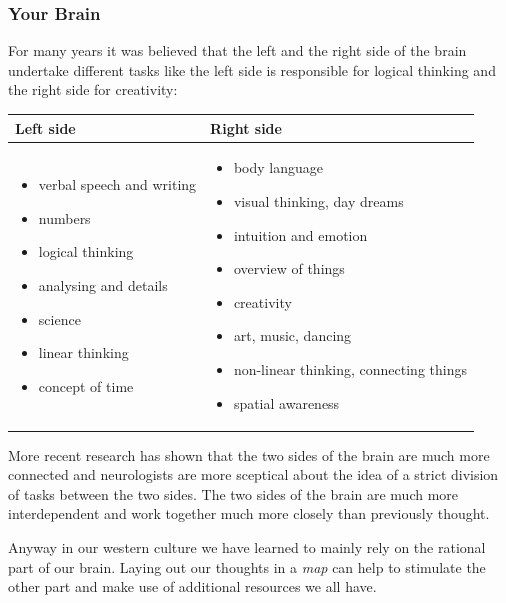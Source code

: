 \documentclass[12pt,a4paper]{article}
\begin{document}
\subsubsection*{Your Brain}
For many years it was believed that the left and the right side of the
brain undertake different tasks like the left side is responsible for
logical thinking and the right side for creativity:
\begin{center}
\begin{tabular}{|p{5.5cm}|p{5.5cm}|} \hline
    Left side & Right side \\ \hline
    \begin{itemize}
       \item verbal speech and writing 
       \item numbers
       \item logical thinking
       \item analysing and details
       \item science
       \item linear thinking
       \item concept of time
    \end{itemize} &
    \begin{itemize}
        \item body language
        \item visual thinking, day dreams
        \item intuition and emotion
        \item overview of things
        \item creativity
        \item art, music, dancing
        \item non-linear thinking, connecting things
        \item spatial awareness
    \end{itemize}     \\ \hline
\end{tabular}   
\end{center}
More recent research has shown that the two sides of the brain are much
more connected and neurologists are more sceptical about the idea of a
strict division of tasks between the two sides. The two sides of the
brain are much more interdependent and work together much more closely
than previously thought.

Anyway in our western culture we have learned to mainly rely on the
rational part of our brain. Laying out our thoughts in a {\em map} can
help to stimulate the other part and make use of additional resources we
all have.
\end{document}

